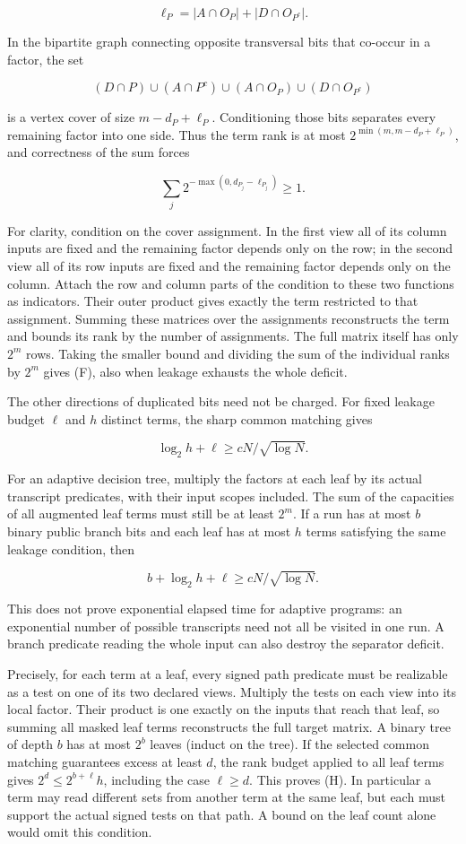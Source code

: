 \documentclass[
  11pt,
]{article}
\begin{document}
\[
\ell_P=|A\cap O_P|+|D\cap O_{P^c}|.
\]

In the bipartite graph connecting opposite transversal bits that
co-occur in a factor, the set

\[
(D\cap P)\cup(A\cap P^c)\cup(A\cap O_P)\cup(D\cap O_{P^c})
\]

is a vertex cover of size \(m-d_P+\ell_P\). Conditioning those bits
separates every remaining factor into one side. Thus the term rank is at
most \(2^{\min(m,m-d_P+\ell_P)}\), and correctness of the sum forces

\[
\sum_j2^{-\max(0,d_{P_j}-\ell_{P_j})}\ge1.
\tag{F}
\]

For clarity, condition on the cover assignment. In the first view all
of its column inputs are fixed and the remaining factor depends only
on the row; in the second view all of its row inputs are fixed and the
remaining factor depends only on the column. Attach the row and column
parts of the condition to these two functions as indicators. Their outer
product gives exactly the term restricted to that assignment. Summing
these matrices over the assignments reconstructs the term and bounds
its rank by the number of assignments. The full matrix itself has only
\(2^m\) rows. Taking the smaller bound and dividing the sum of the
individual ranks by \(2^m\) gives (F), also when leakage exhausts the
whole deficit.

The other directions of duplicated bits need not be charged. For fixed
leakage budget \(\ell\) and \(h\) distinct terms, the sharp common
matching gives

\[
\log_2h+\ell\ge cN/\sqrt{\log N}.
\tag{G}
\]

For an adaptive decision tree, multiply the factors at each leaf by its
actual transcript predicates, with their input scopes included. The sum
of the capacities of all augmented leaf terms must still be at least
\(2^m\). If a run has at most \(b\) binary public branch bits and each
leaf has at most \(h\) terms satisfying the same leakage condition, then

\[
b+\log_2h+\ell\ge cN/\sqrt{\log N}.
\tag{H}
\]

This does not prove exponential elapsed time for adaptive programs: an
exponential number of possible transcripts need not all be visited in
one run. A branch predicate reading the whole input can also destroy the
separator deficit.

Precisely, for each term at a leaf, every signed path predicate must be
realizable as a test on one of its two declared views. Multiply the tests
on each view into its local factor. Their product is one exactly on the
inputs that reach that leaf, so summing all masked leaf terms reconstructs
the full target matrix. A binary tree of depth \(b\) has at most \(2^b\)
leaves (induct on the tree). If the selected common matching guarantees
excess at least \(d\), the rank budget applied to all leaf terms gives
\(2^d\le 2^{b+\ell}h\), including the case \(\ell\ge d\).
This proves (H). In particular a term may read different sets from
another term at the same leaf, but each must support the actual signed
tests on that path. A bound on the leaf count alone would omit this
condition.
\end{document}
